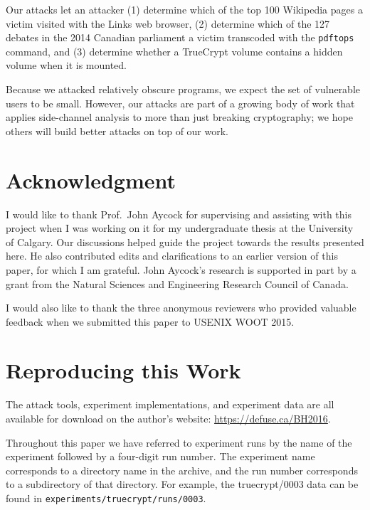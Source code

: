 \documentclass[letterpaper,twocolumn,10pt]{article}
\begin{document}
Our attacks let an attacker (1) determine which of the top 100 Wikipedia pages
a victim visited with the Links web browser, (2) determine which of the 127
debates in the 2014 Canadian parliament a victim transcoded with the
\texttt{pdftops} command, and (3) determine whether a TrueCrypt volume contains
a hidden volume when it is mounted.

Because we attacked relatively obscure programs, we expect the set of vulnerable
users to be small. However, our attacks are part of a growing body of work that
applies side-channel analysis to more than just breaking cryptography; we hope
others will build better attacks on top of our work.

\section*{Acknowledgment}

I would like to thank Prof.\ John Aycock for supervising and assisting with this
project when I was working on it for my undergraduate thesis at the University
of Calgary. Our discussions helped guide the project towards the results
presented here. He also contributed edits and clarifications to an earlier
version of this paper, for which I am grateful. John Aycock's research is
supported in part by a grant from the Natural Sciences and Engineering Research
Council of Canada.

I would also like to thank the three anonymous reviewers who provided valuable
feedback when we submitted this paper to USENIX WOOT 2015.

{\footnotesize 
}

\appendix
\section{Reproducing this Work}
\label{sec:reproducing}

The attack tools, experiment implementations, and experiment data are all
available for download on the author's website:
\url{https://defuse.ca/BH2016}.

Throughout this paper we have referred to experiment runs by the name of the
experiment followed by a four-digit run number. The experiment name
corresponds to a directory name in the archive, and the run number
corresponds to a subdirectory of that directory. For example, the
truecrypt/0003 data can be found in
\texttt{experiments/truecrypt/runs/0003}.
\end{document}
